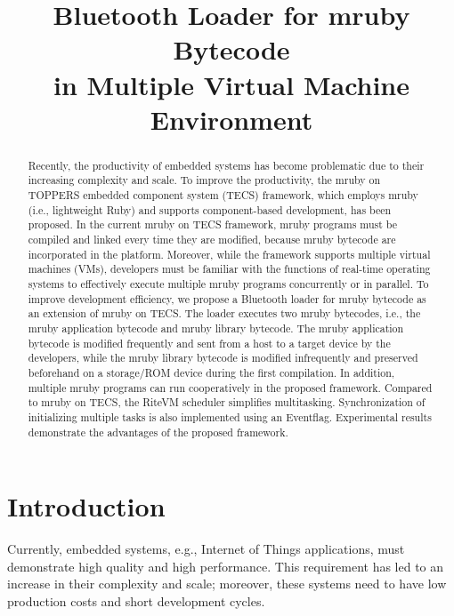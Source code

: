 \documentclass{sig-alternate-05-2015}
\title{Bluetooth Loader for mruby Bytecode \\ in Multiple Virtual Machine Environment}
\begin{document}
\maketitle
\begin{abstract}
Recently, the productivity of embedded systems has become problematic due to their increasing complexity and scale.
To improve the productivity, the mruby on TOPPERS embedded component system (TECS) framework, which employs mruby (i.e., lightweight Ruby) and supports component-based development, has been proposed.
In the current mruby on TECS framework, mruby programs must be compiled and linked every time they are modified, because mruby bytecode are incorporated in the platform.
Moreover, while the framework supports multiple virtual machines (VMs), developers must be familiar with the functions of real-time operating systems to effectively execute multiple mruby programs concurrently or in parallel.
To improve development efficiency, we propose a Bluetooth loader for mruby bytecode as an extension of mruby on TECS.
The loader executes two mruby bytecodes, i.e., the mruby application bytecode and mruby library bytecode.
The mruby application bytecode is modified frequently and sent from a host to a target device by the developers, while the mruby library bytecode is modified infrequently and preserved beforehand on a storage/ROM device during the first compilation.
In addition, multiple mruby programs can run cooperatively in the proposed framework.
Compared to mruby on TECS, the RiteVM scheduler simplifies multitasking.
Synchronization of initializing multiple tasks is also implemented using an Eventflag. 
Experimental results demonstrate the advantages of the proposed framework.
\end{abstract}

\section{Introduction}
Currently, embedded systems, e.g., Internet of Things applications, must demonstrate high quality and high performance.
This requirement has led to an increase in their complexity and scale; moreover, these systems need to have low production costs and short development cycles.
\end{document}
